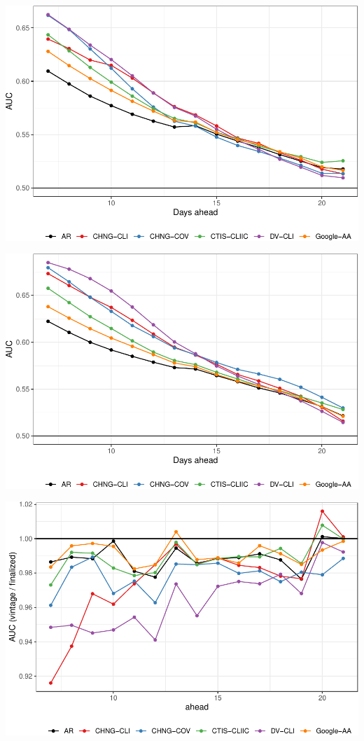 \documentclass[9pt,twoside,lineno]{pnas-new}
\begin{document}
\begin{center}\includegraphics[width=\linewidth]{fig/hot-1} \end{center}

\begin{center}\includegraphics[width=\linewidth]{fig/hot-finalized-1} \end{center}

\begin{center}\includegraphics[width=\linewidth]{fig/hot-honest-v-finalized-1} \end{center}
\end{document}
